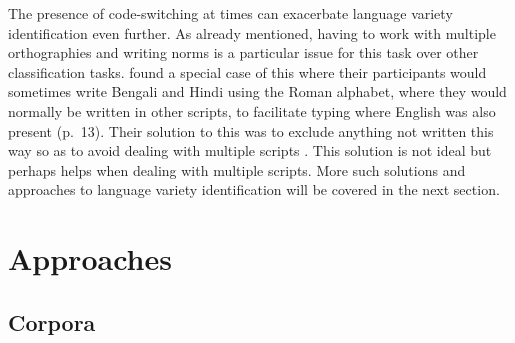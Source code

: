 \documentclass{article}
\begin{document}
      The presence of code-switching at times can exacerbate language variety identification even further.
      As already mentioned, having to work with multiple orthographies and writing norms is a particular issue for this task over other classification tasks.
      \textcite{barman_code_2014} found a special case of this where their participants would sometimes write Bengali and Hindi using the Roman alphabet, where they would normally be written in other scripts, to facilitate typing where English was also present (p.~13).
      Their solution to this was to exclude anything not written this way so as to avoid dealing with multiple scripts \parencite[p.~15]{barman_code_2014}.
      This solution is not ideal but perhaps helps when dealing with multiple scripts.
      More such solutions and approaches to language variety identification will be covered in the next section.


  \section{Approaches}
    \subsection{Corpora}
\end{document}
